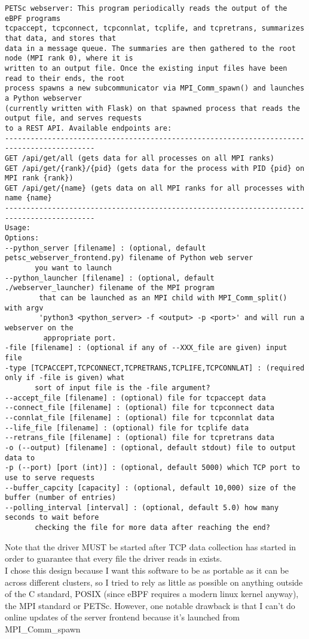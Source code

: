 \begin{Verbatim}[xleftmargin=-3cm]
PETSc webserver: This program periodically reads the output of the eBPF programs
tcpaccept, tcpconnect, tcpconnlat, tcplife, and tcpretrans, summarizes that data, and stores that
data in a message queue. The summaries are then gathered to the root node (MPI rank 0), where it is
written to an output file. Once the existing input files have been read to their ends, the root
process spawns a new subcommunicator via MPI_Comm_spawn() and launches a Python webserver
(currently written with Flask) on that spawned process that reads the output file, and serves requests
to a REST API. Available endpoints are:
-------------------------------------------------------------------------------------------
GET /api/get/all (gets data for all processes on all MPI ranks)
GET /api/get/{rank}/{pid} (gets data for the process with PID {pid} on MPI rank {rank})
GET /api/get/{name} (gets data on all MPI ranks for all processes with name {name}
-------------------------------------------------------------------------------------------
Usage:
Options:
--python_server [filename] : (optional, default petsc_webserver_frontend.py) filename of Python web server
       you want to launch
--python_launcher [filename] : (optional, default ./webserver_launcher) filename of the MPI program
        that can be launched as an MPI child with MPI_Comm_split() with argv
        'python3 <python_server> -f <output> -p <port>' and will run a webserver on the
         appropriate port.
-file [filename] : (optional if any of --XXX_file are given) input file
-type [TCPACCEPT,TCPCONNECT,TCPRETRANS,TCPLIFE,TCPCONNLAT] : (required only if -file is given) what
       sort of input file is the -file argument?
--accept_file [filename] : (optional) file for tcpaccept data
--connect_file [filename] : (optional) file for tcpconnect data
--connlat_file [filename] : (optional) file for tcpconnlat data
--life_file [filename] : (optional) file for tcplife data
--retrans_file [filename] : (optional) file for tcpretrans data
-o (--output) [filename] : (optional, default stdout) file to output data to
-p (--port) [port (int)] : (optional, default 5000) which TCP port to use to serve requests
--buffer_capcity [capacity] : (optional, default 10,000) size of the buffer (number of entries)
--polling_interval [interval] : (optional, default 5.0) how many seconds to wait before
       checking the file for more data after reaching the end?
\end{Verbatim}
Note that the driver MUST be started after TCP data collection has started in order to guarantee that every file the driver reads in exists.\\
I chose this design because I want this software to be as portable as it can be across different clusters, so I tried to rely as little as possible on anything outside of the C standard, POSIX (since eBPF requires a modern linux kernel anyway), the MPI standard or PETSc. However, one notable drawback is that I can't do online updates of the server frontend because it's launched from MPI_Comm_spawn
